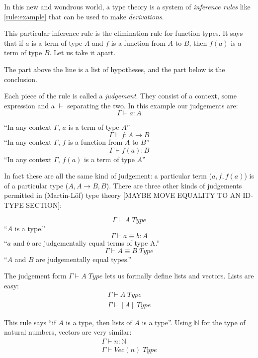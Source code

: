 In this new and wondrous world, a type theory is a system of \emph{inference
  rules} like \ref{rule:example} that can be used to make \emph{derivations}.

This particular inference rule is the elimination rule for function types. It
says that if $a$ is a term of type $A$ and $f$ is a function from $A$ to $B$,
then $f(a)$ is a term of type $B$. Let us take it apart.

The part above the line is a list of hypotheses, and the part below is the conclusion.

Each piece of the rule is called a \emph{judgement}. They consist of a
context, some expression and a $\vdash$ separating the two. In this example our judgements are:
\[\Gamma \vdash a : A\]
\begin{center}
``In any context $\Gamma$, $a$ is a term of type $A$''
\[\Gamma \vdash f : A \rightarrow B\]
``In any context $\Gamma$, $f$ is a function from $A$ to $B$''
\[\Gamma \vdash f(a) : B\]
``In any context $\Gamma$, $f(a)$ is a term of type $A$''
\end{center}

In fact these are all the same kind of judgement: a particular term ($a, f, f(a)$) is of a
particular type ($A, A \rightarrow B, B$). There are three other kinds of
judgements permitted in (Martin-Löf) type theory [MAYBE MOVE EQUALITY TO AN
ID-TYPE SECTION]:
\begin{center}
  \[\Gamma \vdash A \; Type\]
  ``$A$ is a type.''
  \[\Gamma \vdash a \equiv b : A\]
  ``$a$ and $b$ are judgementally equal terms of type A.''
  \[\Gamma \vdash A \equiv B \; Type\]
  ``$A$ and $B$ are judgementally equal types.''
\end{center}

The judgement form $\Gamma \vdash A \; Type$ lets us formally define lists and
vectors. Lists are easy:
\begin{equation*}
  \begin{array}{c}
    \Gamma \vdash A \; Type \\
    \hline
    \Gamma \vdash [A] \; Type
  \end{array}
  \label{rule:lists}
\end{equation*}

This rule says ``if $A$ is a type, then lists of $A$ is a type''. Using
$\mathbb{N}$ for the type of natural numbers, vectors are very similar:
\begin{equation*}
  \begin{array}{c}
    \Gamma \vdash n : \mathbb{N} \\
    \hline
    \Gamma \vdash Vec (n) \; Type
  \end{array}
  \label{rule:lists}
\end{equation*}

